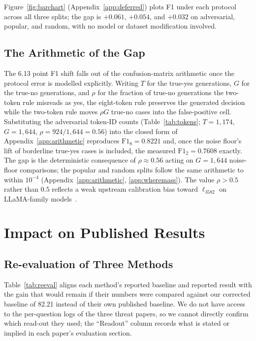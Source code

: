 \documentclass{article}
\begin{document}
Figure~\ref{fig:barchart} (Appendix~\ref{app:deferred}) plots F1 under
each protocol across all three splits; the gap is $+0.061$, $+0.054$,
and $+0.032$ on adversarial, popular, and random, with no model or
dataset modification involved.

\subsection{The Arithmetic of the Gap}
\label{sec:math}

The 6.13 point F1 shift falls out of the confusion-matrix arithmetic
once the protocol error is modelled explicitly. Writing $T$ for the
true-yes generations, $G$ for the true-no generations, and $\rho$ for
the fraction of true-no generations the two-token rule misreads as yes,
the eight-token rule preserves the generated decision while the
two-token rule moves $\rho G$ true-no cases into the false-positive cell.
Substituting the adversarial token-ID counts (Table~\ref{tab:tokens};
$T{=}1{,}174$, $G{=}1{,}644$, $\rho = 924/1{,}644 = 0.56$) into the
closed form of Appendix~\ref{app:arithmetic} reproduces
$\mathrm{F1}_8 = 0.8221$ and, once the noise floor's lift of borderline
true-yes cases is included, the measured $\mathrm{F1}_2 = 0.7608$
exactly. The gap is the deterministic consequence of $\rho \approx 0.56$
acting on $G = 1{,}644$ noise-floor comparisons; the popular and random
splits follow the same arithmetic to within $10^{-4}$
(Appendix~\ref{app:arithmetic}, \ref{app:wheremass}). The value
$\rho > 0.5$ rather than $0.5$ reflects a weak upstream calibration bias
toward $\ell_{3582}$ on LLaMA-family models~\citep{liang2022holistic}.

\section{Impact on Published Results}
\label{sec:impact}

\subsection{Re-evaluation of Three Methods}

Table~\ref{tab:reeval} aligns each method's reported baseline and
reported result with the gain that would remain if their numbers were
compared against our corrected baseline of 82.21 instead of their own
published baseline. We do not have access to the per-question logs of
the three threat papers, so we cannot directly confirm which read-out
they used; the ``Readout'' column records what is stated or implied in
each paper's evaluation section.
\end{document}
